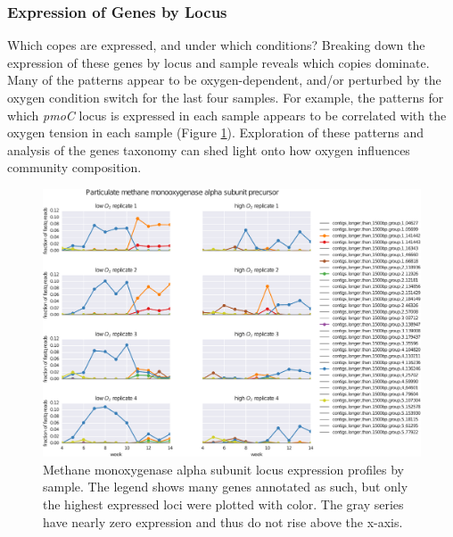 \subsubsection{Expression of Genes by Locus}

Which copes are expressed, and under which conditions?
Breaking down the expression of these genes by locus and sample reveals which copies dominate.
Many of the patterns appear to be oxygen-dependent, and/or perturbed by the oxygen condition switch for the last four samples.
For example, the patterns for which \textit{pmoC} locus is expressed in each sample appears to be correlated with the oxygen tension in each sample (Figure \ref{fig:mmo_alpha}).
Exploration of these patterns and analysis of the genes taxonomy can shed light onto how oxygen influences community composition.

\begin{figure}[H]
\centering
    \includegraphics[width=1.0\textwidth]{./tex/chapter2/figures/170328_loci_read_fracs_Particulate_methane_monooxygenase_alpha_subunit_precursor--portrait--cleaned.pdf}
    \begin{singlespace}
    \caption[Methane monoxygenase alpha subunit locus expression profiles by sample]{
        Methane monoxygenase alpha subunit locus expression profiles by sample.
        The legend shows many genes annotated as such, but only the highest expressed loci were plotted with color.
        The gray series have nearly zero expression and thus do not rise above the x-axis.
        }
    \label{fig:mmo_alpha}
    \end{singlespace}
\end{figure}

